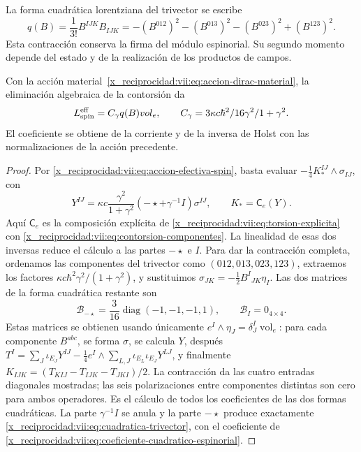 La forma cuadrática lorentziana del trivector se escribe
\begin{equation}
 q(B)=\frac1{3!}B^{IJK}B_{IJK}
 =-(B^{012})^2-(B^{013})^2-(B^{023})^2+(B^{123})^2.
 \label{x_reciprocidad:vii:eq:cuadratica-trivector}
\end{equation}
Esta contracción conserva la firma del módulo espinorial. Su segundo
momento depende del estado y de la realización de los productos de
campos.

\begin{theorem}
\label{x_reciprocidad:vii:thm:coeficiente-torsional-espinorial}
Con la acción material~\eqref{x_reciprocidad:vii:eq:accion-dirac-material}, la
eliminación algebraica de la contorsión da
\begin{equation}
 \mathcal L_{\rm spin}^{\rm eff}
 =C_\gamma q(B)\operatorname{vol}_e,\qquad
 C_\gamma=\frac{3\kappa c\hbar^2}{16}
                      \frac{\gamma^2}{1+\gamma^2}.
 \label{x_reciprocidad:vii:eq:coeficiente-cuadratico-espinorial}
\end{equation}
El coeficiente se obtiene de la corriente y de la inversa de Holst
con las normalizaciones de la acción precedente.
\end{theorem}
\begin{proof}
Por \eqref{x_reciprocidad:vii:eq:accion-efectiva-spin}, basta evaluar
\(-\frac14K_*^{IJ}\wedge\sigma_{IJ}\), con
\[
 Y^{IJ}=\kappa c\frac{\gamma^2}{1+\gamma^2}
           (-\star+\gamma^{-1}I)\sigma^{IJ},\qquad
 K_*=\mathsf C_e(Y).
\]
Aquí \(\mathsf C_e\) es la composición explícita de
\eqref{x_reciprocidad:vii:eq:torsion-explicita} con
\eqref{x_reciprocidad:vii:eq:contorsion-componentes}. La linealidad de esas dos
inversas reduce el cálculo a las partes \(-\star\) e \(I\).
Para dar la contracción completa, ordenamos las componentes del
trivector como \((012,013,023,123)\), extraemos los factores
\(\kappa c\hbar^2\gamma^2/(1+\gamma^2)\), y sustituimos
\(\sigma_{JK}=-\frac12B^I{}_{JK}\eta_I\). Las dos matrices
de la forma cuadrática restante son
\begin{equation}
 \mathcal B_{-\star}
 =\frac3{16}\operatorname{diag}(-1,-1,-1,1),\qquad
 \mathcal B_I=0_{4\times4}.
 \label{x_reciprocidad:vii:eq:matrices-contraccion-espinorial}
\end{equation}
Estas matrices se obtienen usando únicamente
\(e^I\wedge\eta_J=\delta_J^I\operatorname{vol}_e\): para
cada componente \(B^{abc}\), se forma \(\sigma\), se calcula
\(Y\), después
\(T^I=\sum_J\iota_{E_J}Y^{IJ}
 -\frac14e^I\wedge\sum_{L,J}\iota_{E_L}\iota_{E_J}Y^{LJ}\),
y finalmente
\(K_{IJK}=(T_{KIJ}-T_{IJK}-T_{JKI})/2\).
La contracción da las cuatro entradas diagonales mostradas; las
seis polarizaciones entre componentes distintas son cero para ambos
operadores. Es el cálculo de todos los coeficientes de las dos
formas cuadráticas. La parte \(\gamma^{-1}I\) se anula y la parte
\(-\star\) produce exactamente \eqref{x_reciprocidad:vii:eq:cuadratica-trivector},
con el coeficiente de \eqref{x_reciprocidad:vii:eq:coeficiente-cuadratico-espinorial}.
\end{proof}

